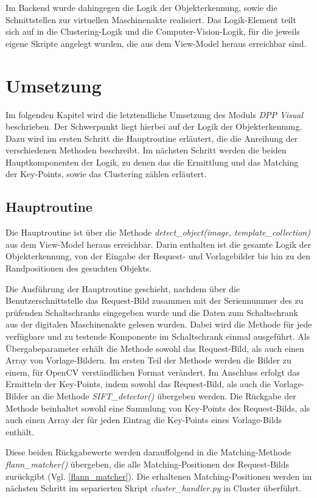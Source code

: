 \documentclass[
    type=Projektarbeit,
    status=draft, %
    language=german, %
    bibengine=bibtex,
]{unibwm-inf-thesis}
\begin{document}
    Im Backend wurde dahingegen die Logik der Objekterkennung, sowie die Schnittstellen zur virtuellen Maschinenakte realisiert.
    Das Logik-Element teilt sich auf in die Clustering-Logik und die Computer-Vision-Logik, für die jeweils eigene
    Skripte angelegt wurden, die aus dem View-Model heraus erreichbar sind.

    \section{Umsetzung}
    Im folgenden Kapitel wird die letztendliche Umsetzung des Moduls \textit{DPP Visual} beschrieben.
    Der Schwerpunkt liegt hierbei auf der Logik der Objekterkennung.
    Dazu wird im ersten Schritt die Hauptroutine erläutert, die die Anreihung der verschiedenen Methoden beschreibt.
    Im nächsten Schritt werden die beiden Hauptkomponenten der Logik, zu denen das die Ermittlung und das Matching der Key-Points, sowie das Clustering zählen erläutert.

    \subsection{Hauptroutine}
    Die Hauptroutine ist über die Methode \textit{detect\_object(image, template\_collection)} aus dem View-Model heraus erreichbar.
    Darin enthalten ist die gesamte Logik der Objekterkennung, von der Eingabe der Request- und Vorlagebilder bis hin zu den Randpositionen des gesuchten Objekts.

    Die Ausführung der Hauptroutine geschieht, nachdem über die Benutzerschnittstelle das Request-Bild zusammen mit der Seriennummer des zu prüfenden Schaltschranks eingegeben wurde und die Daten zum Schaltschrank aus der digitalen Maschinenakte gelesen wurden.
    Dabei wird die Methode für jede verfügbare und zu testende Komponente im Schaltschrank einmal ausgeführt.
    Als Übergabeparameter erhält die Methode sowohl das Request-Bild, als auch einen Array von Vorlage-Bildern.
    Im ersten Teil der Methode werden die Bilder zu einem, für OpenCV verständlichen Format verändert.
    Im Anschluss erfolgt das Ermitteln der Key-Points, indem sowohl das Request-Bild, als auch die Vorlage-Bilder an die Methode \textit{SIFT\_detector()} übergeben werden.
    Die Rückgabe der Methode beinhaltet sowohl eine Sammlung von Key-Points des Request-Bilds, als auch einen Array der für jeden Eintrag die Key-Points eines Vorlage-Bilds enthält.

    Diese beiden Rückgabewerte werden darauffolgend in die Matching-Methode \textit{flann\_matcher()} übergeben, die alle Matching-Positionen des Request-Bilds zurückgibt (Vgl. \autoref{flann_matcher}).
    Die erhaltenen Matching-Positionen werden im nächsten Schritt im separierten Skript \textit{cluster\_handler.py} in Cluster überführt.
\end{document}
